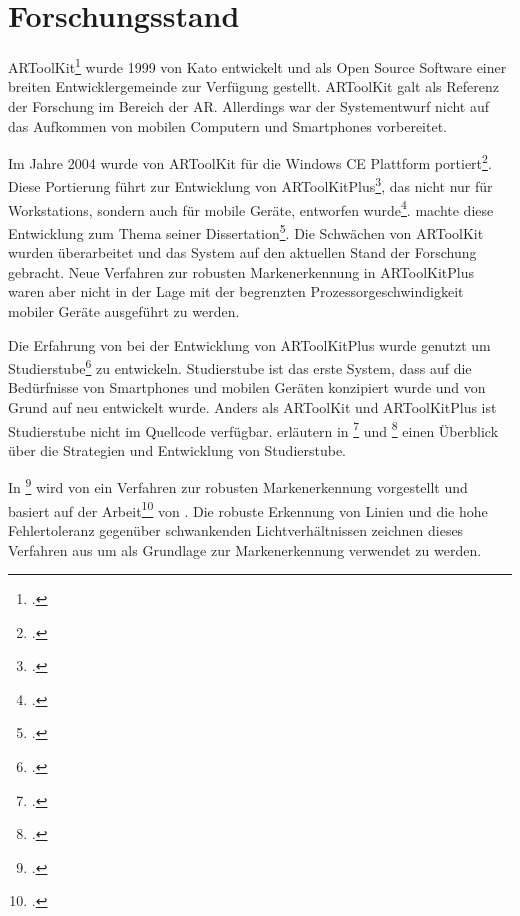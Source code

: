 \section{Forschungsstand} %
\label{sec:forschungsstand}
\begin{comment}
	Forschungsstand: Alle untersuchten Arbeiten aufführen und kurz erklären.
\end{comment}

ARToolKit\footcite{artoolkit} wurde 1999 von Kato entwickelt und als Open Source Software einer breiten
 Entwicklergemeinde zur Verfügung gestellt. ARToolKit galt als Referenz der Forschung im Bereich der \gls{AR}.
 Allerdings war der Systementwurf nicht auf das Aufkommen von mobilen Computern und Smartphones vorbereitet.

Im Jahre 2004 wurde von \citeauthor{wagner04} ARToolKit für die Windows CE Plattform portiert\footcite{wagner04}. Diese
 Portierung führt zur Entwicklung von ARToolKitPlus\footcite{artoolkitplus}, das nicht nur für Workstations, sondern
 auch für mobile Geräte, entworfen wurde\footcite{wagner07b}. \citeauthor{wagner07a} machte diese Entwicklung zum Thema
 seiner Dissertation\footcite{wagner07a}. Die Schwächen von ARToolKit wurden überarbeitet und das System auf den
 aktuellen Stand der Forschung gebracht. Neue Verfahren zur robusten Mar\-ken\-er\-kennung in ARToolKitPlus waren aber
 nicht in der Lage mit der begrenzten Prozessorgeschwindigkeit mobiler Geräte ausgeführt zu werden.

Die Erfahrung von \citeauthor{wagner04} bei der Entwicklung von ARToolKitPlus wurde genutzt um
 Studierstube\footcite{studierstube} zu entwickeln. Studierstube ist das erste System, dass auf die Bedürfnisse von
 Smartphones und mobilen Geräten konzipiert wurde und von Grund auf neu entwickelt wurde. Anders als ARToolKit und
 ARToolKitPlus ist Studierstube nicht im Quellcode verfügbar.
\citeauthor{wagner09a} erläutern in \footcite{wagner09a} und
 \footcite{wagner09b} einen Überblick über die Strategien und Entwicklung von Studierstube.

In \footcite{hirzer08} wird von \citeauthor{hirzer08} ein Verfahren zur robusten Markenerkennung
 vorgestellt und basiert auf der Arbeit\footcite{clarke96} von \citeauthor{clarke96}. Die robuste Erkennung von Linien
 und die hohe Fehlertoleranz gegenüber schwankenden Lichtverhältnissen zeichnen dieses Verfahren aus um als Grundlage
 zur Markenerkennung verwendet zu werden.

